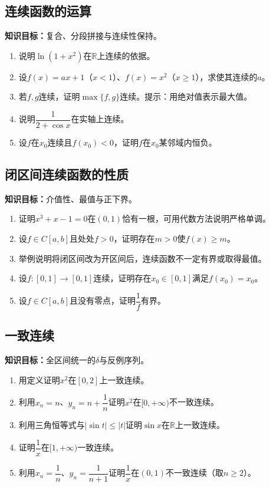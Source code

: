 \documentclass[11pt,a4paper,fontset=fandol]{ctexrep}
\newcommand{\goal}[1]{\textbf{知识目标：}#1\par}
\begin{document}
\subsection{连续函数的运算}
\goal{复合、分段拼接与连续性保持。}
\begin{enumerate}
\item 说明$\ln(1+x^2)$在$\mathbb R$上连续的依据。
\item 设$f(x)=ax+1$（$x<1$）、$f(x)=x^2$（$x\ge1$），求使其连续的$a$。
\item 若$f,g$连续，证明$\max\{f,g\}$连续。提示：用绝对值表示最大值。
\item 说明$\dfrac{1}{2+\cos x}$在实轴上连续。
\item 设$f$在$x_0$连续且$f(x_0)<0$，证明$f$在$x_0$某邻域内恒负。
\end{enumerate}
\subsection{闭区间连续函数的性质}
\goal{介值性、最值与正下界。}
\begin{enumerate}
\item 证明$x^3+x-1=0$在$(0,1)$恰有一根，可用代数方法说明严格单调。
\item 设$f\in C[a,b]$且处处$f>0$，证明存在$m>0$使$f(x)\ge m$。
\item 举例说明将闭区间改为开区间后，连续函数不一定有界或取得最值。
\item 设$f:[0,1]\to[0,1]$连续，证明存在$x_0\in[0,1]$满足$f(x_0)=x_0$。
\item 设$f\in C[a,b]$且没有零点，证明$\dfrac{1}{f}$有界。
\end{enumerate}
\subsection{一致连续}
\goal{全区间统一的$\delta$与反例序列。}
\begin{enumerate}
\item 用定义证明$x^2$在$[0,2]$上一致连续。
\item 利用$x_n=n$、$y_n=n+\dfrac{1}{n}$证明$x^2$在$[0,+\infty)$不一致连续。
\item 利用三角恒等式与$|\sin t|\le|t|$证明$\sin x$在$\mathbb R$上一致连续。
\item 证明$\dfrac{1}{x}$在$[1,+\infty)$一致连续。
\item 利用$x_n=\dfrac{1}{n}$、$y_n=\dfrac{1}{n+1}$证明$\dfrac{1}{x}$在$(0,1)$不一致连续（取$n\ge2$）。
\end{enumerate}
\end{document}
